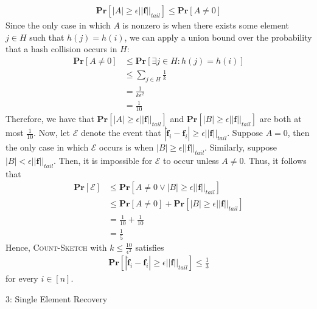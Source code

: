 \documentclass[12pt]{article}
\begin{document}
\begin{solution}
\begin{align*}
        \textbf{Pr}[|A| \geq \epsilon||\textbf{f}||_{tail}] \leq \textbf{Pr}[A \neq 0]
    \end{align*}
    Since the only case in which $A$ is nonzero is when there exists some element $j \in H$ such that $h(j) = h(i)$, we can apply a union bound over the probability that a hash collision occurs in $H$:
    \begin{align*}
        \textbf{Pr}[A \neq 0] &\leq \textbf{Pr}[\exists j \in H: h(j) = h(i)] \\
        &\leq \sum\limits_{j \in H} \frac{1}{k} \\
        &= \frac{1}{k\epsilon^2} \\
        &= \frac{1}{10}
    \end{align*}
    Therefore, we have that $\textbf{Pr}[|A| \geq \epsilon||\textbf{f}||_{tail}]$ and $\textbf{Pr}[|B| \geq \epsilon||\textbf{f}||_{tail}]$ are both at most $\frac{1}{10}$. Now, let $\mathcal{E}$ denote the event that $|\hat{\textbf{f}}_i - \textbf{f}_i| \geq \epsilon||\textbf{f}||_{tail}$. Suppose $A = 0$, then the only case in which $\mathcal{E}$ occurs is when $|B| \geq \epsilon||\textbf{f}||_{tail}$. Similarly, suppose $|B| < \epsilon||\textbf{f}||_{tail}$. Then, it is impossible for $\mathcal{E}$ to occur unless $A \neq 0$. Thus, it follows that
    \begin{align*}
        \textbf{Pr}[\mathcal{E}] &\leq \textbf{Pr}[A \neq 0 \lor |B| \geq \epsilon||\textbf{f}||_{tail}] \\
        &\leq \textbf{Pr}[A \neq 0] + \textbf{Pr}[|B| \geq \epsilon||\textbf{f}||_{tail}] \\
        &= \frac{1}{10} + \frac{1}{10} \\
        &= \frac{1}{5}
    \end{align*}
    Hence, \textsc{Count-Sketch} with $k \leq \frac{10}{\epsilon^2}$ satisfies 
    \begin{align*}
          \textbf{Pr}[|\hat{\textbf{f}}_i - \textbf{f}_i| \geq \epsilon ||\textbf{f}||_{tail}] \leq \frac{1}{3}
    \end{align*}
    for every $i \in [n]$.
\end{solution}

\begin{problem}{3: Single Element Recovery} 
\end{problem}
\end{document}
